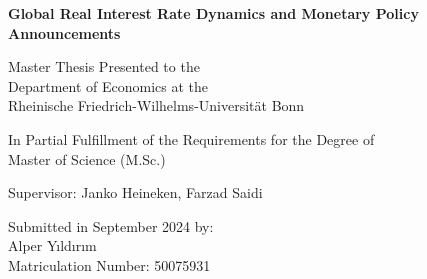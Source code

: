 \begin{titlepage}
    \begin{center}
        \vspace*{2cm}
            
        \LARGE
        \textbf{Global Real Interest Rate Dynamics and Monetary Policy Announcements}
            
        \vspace{3cm}

        \large
        Master Thesis Presented to the \\ Department of Economics at the \\
        Rheinische Friedrich-Wilhelms-Universität Bonn

        \vspace{1.5cm}

        In Partial Fulfillment of the Requirements for the Degree of \\
        Master of Science (M.Sc.)

        \vfill

        Supervisor: Janko Heineken, Farzad Saidi

        \vspace{1cm}

        Submitted in September 2024 by:\\
        Alper Yıldırım \\
        Matriculation Number: 50075931
            
    \end{center}
\end{titlepage}